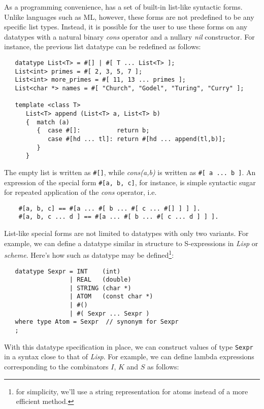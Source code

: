 As a programming convenience, \Prop{} has a set of built-in list-like
syntactic forms.  Unlike languages such as ML, however,
these forms are not predefined to be any specific list types.  Instead, it is
possible for the user to use these forms on any datatypes with
a natural binary {\em cons} operator and a nullary {\em nil} constructor.
For instance, the previous list datatype can be redefined as follows:
 
\begin{verbatim}
   datatype List<T> = #[] | #[ T ... List<T> ];
   List<int> primes = #[ 2, 3, 5, 7 ];
   List<int> more_primes = #[ 11, 13 ... primes ];
   List<char *> names = #[ "Church", "Godel", "Turing", "Curry" ];
 
   template <class T>
      List<T> append (List<T> a, List<T> b)
      {  match (a)
         {  case #[]:          return b;
            case #[hd ... tl]: return #[hd ... append(tl,b)];
         }
      }
\end{verbatim}
The empty list is written as \verb|#[]|, while {\em cons(a,b)}
is written as \verb|#[ a ... b ]|.   An expression of the special form
\verb|#[a, b, c]|, for instance, is simple syntactic sugar for
repeated application of the {\em cons} operator, i.e.
 
\begin{verbatim}
    #[a, b, c] == #[a ... #[ b ... #[ c ... #[] ] ] ].
    #[a, b, c ... d ] == #[a ... #[ b ... #[ c ... d ] ] ].
\end{verbatim}
 
List-like special forms are not limited to datatypes with only two variants.
For example, we can define a datatype similar in structure to S-expressions
in {\em Lisp} or {\em scheme}.  Here's how such as datatype may be
defined\footnote{for simplicity, we'll use a string representation for atoms
instead of a more efficient method.}:
 
\begin{verbatim}
   datatype Sexpr = INT    (int)
                  | REAL   (double)
                  | STRING (char *)
                  | ATOM   (const char *)
                  | #()
                  | #( Sexpr ... Sexpr )
   where type Atom = Sexpr  // synonym for Sexpr
   ;
\end{verbatim}
 
   With this datatype specification in place, we can construct values
of type \verb|Sexpr| in a syntax close to that of {\em Lisp}.  For example,
we can define lambda expressions corresponding to the combinators $I$, $K$
and $S$ as follows:
 
